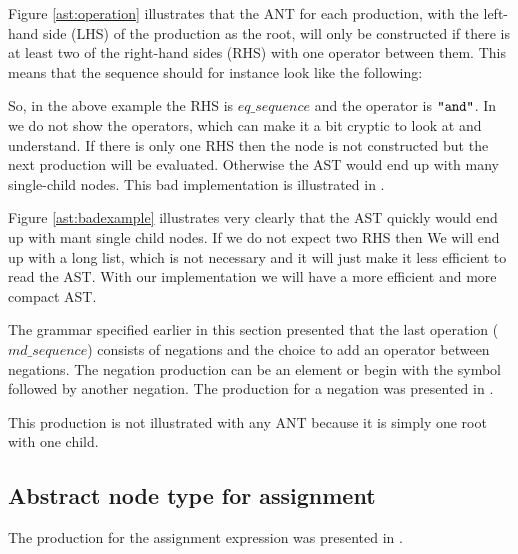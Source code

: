 Figure \ref{ast:operation} illustrates that the ANT for each production, with
the left-hand side (LHS) of the production as the root, will only be constructed
if there is at least two of the right-hand sides (RHS) with one operator between
them. This means that the sequence should for instance look like the following:

\begin{ebnf}
\end{ebnf}

So, in the above example the RHS is $eq\_sequence$ and the operator is
$\texttt{"and"}$. In  we do not show the operators, which can
make it a bit cryptic to look at and understand. If there is only one RHS then
the node is not constructed but the next production will be evaluated. Otherwise
the AST would end up with many single-child nodes. This bad implementation is 
illustrated in .



Figure \ref{ast:badexample} illustrates very clearly that the AST quickly would
end up with mant single child nodes. If we do not expect two RHS then We will 
end up with a long list, which is not necessary and it will just make it less 
efficient to read the AST. With our implementation we will have a more efficient 
and more compact AST.

The grammar specified earlier in this section presented that the last operation
($md\_sequence$) consists of negations and the choice to add an operator between
negations. The negation production can be an element or begin with the \gter{-}
symbol followed by another negation. The production for a negation was presented
in .


This production is not illustrated with any ANT because it is simply one root
with one child.

\subsection{Abstract node type for assignment}
The production for the assignment expression was presented in
.


